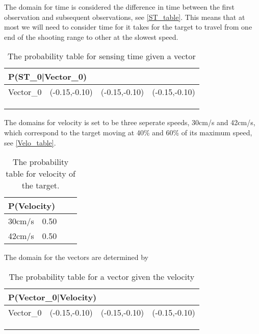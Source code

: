 The domain for time is considered the difference in time between the first
observation and subsequent observations, see \autoref{ST_table}. This means
that at most we will need to consider time for it takes for the target to
travel from one end of the shooting range to other at the slowest speed.

\begin{center}
\begin{table}[H]
\label{ST_table}
\begin{tabular}{|l|l|l|l|}
\hline
\multicolumn{4}{|l|}{P(ST\_0|Vector\_0)} \\ \hline
Vector\_0     & (-0.15,-0.10) & (-0.15,-0.10)    & (-0.15,-0.10)  \\\hline   
[0 - 1500]      &     &     &     \\ \hline 
[1501 - 3000]    &     &     &     \\ \hline
[3001 - 4500]   &     &     &     \\ \hline
\end{tabular}
\caption{The probability table for sensing time given a vector}
\end{table}
\end{center}

The domains for velocity is set to be three seperate speeds, 30cm/s and 42cm/s,
which correspond to the target moving at 40\% and 60\% of its maximum speed,
see \autoref{Velo_table}.

\begin{center}
\begin{table}[H]
\label{Velo_table}
\begin{tabular}{|l|l|l|l|}
\hline
\multicolumn{4}{|l|}{P(Velocity)} \\ \hline
30cm/s   & 0.50   \\\hline   
42cm/s   & 0.50   \\ \hline
\end{tabular}
\caption{The probability table for velocity of the target.}
\end{table}
\end{center}

The domain for the vectors are determined by 

\begin{center}
\begin{table}[H]
\label{Vector0_table}
\begin{tabular}{|l|l|l|l|}
\hline
\multicolumn{4}{|l|}{P(Vector\_0|Velocity)} \\ \hline
Vector\_0     & (-0.15,-0.10) & (-0.15,-0.10)    & (-0.15,-0.10)  \\\hline   
[0 - 1500]      &     &     &     \\ \hline 
[1501 - 3000]    &     &     &     \\ \hline
[3001 - 4500]   &     &     &     \\ \hline
\end{tabular}
\caption{The probability table for a vector given the velocity}
\end{table}
\end{center}

